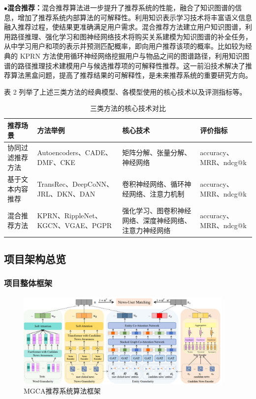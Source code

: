 \documentclass[withoutpreface,bwprint]{cumcmthesis} %
\begin{document}
	$\bullet$\textbf{混合推荐：}混合推荐算法进一步提升了推荐系统的性能，融合了知识图谱的信息，增加了推荐系统内部算法的可解释性。利用知识表示学习技术将丰富语义信息融入推荐过程，使结果更准确满足用户需求。混合推荐方法建立用户知识图谱，利用路径推理、强化学习和图神经网络技术将购买关系建模为知识图谱的补全任务，从中学习用户和项的表示并预测匹配概率，即向用户推荐该项的概率。比如较为经典的 KPRN 方法使用循环神经网络挖掘用户与物品之间的图谱路径，利用知识图谱的路径推理技术建模用户与候选推荐项的可解释性推荐。这一前沿技术解决了推荐算法黑盒问题，提高了推荐结果的可解释性，是未来推荐系统的重要研究方向。\par
	表 2 列举了上述三类方法的经典模型、各模型使用的核心技术以及评测指标等。
	\begin{table}[H]
	\centering
	\caption{三类方法的核心技术对比}
	\begin{tabular}{|m{2cm}|m{4cm}|m{4cm}|m{4cm}|}
		\hline
		推荐场景 & 方法举例 & 核心技术 & 评价指标 \\
		\hline
		协同过滤推荐方法 & Autoencoders、CADE、DMF、CKE & 矩阵分解、张量分解、神经网络 & accuracy、MRR、ndcg@k \\
		\hline
		基于文本内容推荐 & TransRec、DeepCoNN、JRL、DKN、DAN & 卷积神经网络、循环神经网络、注意力机制 & accuracy、MRR、ndcg@k \\
		\hline
		混合推荐方法 & KPRN、RippleNet、KGCN、VGAE、PGPR & 强化学习、图卷积神经网络、深度神经网络、注意力神经网络 & accuracy、MRR、ndcg@k \\
		\hline
	\end{tabular}
\end{table}
	\subsection{项目架构总览}
	\subsubsection{ 项目整体框架}
	\begin{figure}[H]
		\centering
		\includegraphics[width=0.95\textwidth]{MGCA}
		\caption{MGCA推荐系统算法框架}
		\label{fig:circuit-diagcam}
	\end{figure}
\end{document}
